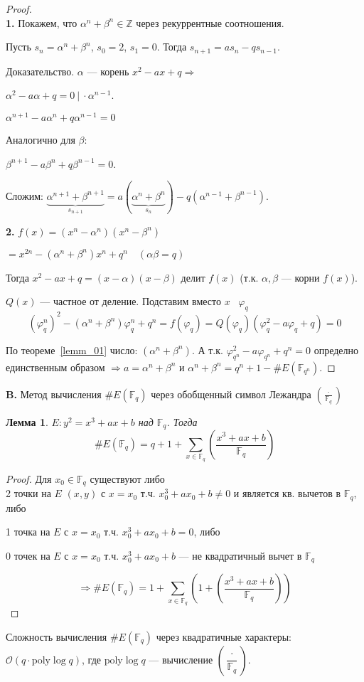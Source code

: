 \documentclass[12pt]{article}
\newcommand{\Z}{{{\mathbb Z}}}
\newcommand{\F}{{{\mathbb F}}}
\newcommand{\bigO}{\mathcal{O}}
\newtheorem{lemma}[theorem]{Лемма}
\theoremstyle{definition}
\theoremstyle{definition}
\theoremstyle{definition}
\begin{document}
\begin{proof}
$ $\\
\textbf{1. } Покажем, что ${\alpha^n} + {\beta ^n} \in \Z$ через рекуррентные соотношения.

Пусть ${s_n} = {\alpha ^n} + {\beta ^n}$, ${s_0} = 2$, ${s_1} = 0$. Тогда $s_{n + 1} = a{s_n} - qs_{n - 1}.$

Доказательство. $\alpha $ — корень $x^2 - ax + q \Rightarrow $

${\alpha ^2} - a \alpha + q = 0 \ |\ \cdot {\alpha^{n - 1}}$. 

${\alpha ^{n + 1}} - a{\alpha ^n} + q{\alpha ^{n - 1}} = 0$

Аналогично для $\beta $: 

${\beta ^{n+1}} - a {\beta ^n} + q{\beta ^{n - 1}} = 0$. 

Сложим: $\underbrace {{\alpha ^{n + 1}} + \beta ^{n + 1}}_{s_{n + 1}} = a ( {\underbrace {{\alpha^n} + {\beta ^n}}_{{s_n}}} ) - q( {{\alpha ^{n - 1}} + {\beta ^{n - 1}}} ).$

\textbf{2.} $f( x ) = ( {{x^n} - {\alpha^n}} ){( {{x^n} - {\beta ^n}} )}$

$ = {x^{2n}} - ( \alpha^n + \beta^n ){x^n} + {q^n}\quad ( \alpha\beta  = q )$

Тогда ${x^2} - ax + q = ( {x - \alpha } )( {x - \beta } )$ делит $f( x )$ (т.к. $\alpha, \beta $ — корни $f(x)$). 

$Q( x )$ — частное от деление. Подставим вместо $x$ \ $\varphi_q$
$$
( {\varphi _q^n} )^2 - ( {{\alpha^n} + {\beta ^n}} )\varphi _q^n + {q^n} = f( {{\varphi_q}} ) = Q( {{\varphi _q}} )( {\varphi _q^2 - a{\varphi _q} + q} ) = 0
$$

По теореме~\ref{lemm_01} число: $(\alpha^n + \beta^n )$. А т.к. $\varphi _{{q^n}}^2 - {a\varphi _{q^n}} + {q^n} = 0$  определно единственным образом $ \Rightarrow a = {\alpha ^n} + {\beta ^n}$ и ${\alpha ^n} + {\beta ^n} = {q^n} + 1 - \# E( {{\F_{q^n}}} )$. 
\end{proof}

\textbf{B.} Метод вычисления $\# E( \F_q )$ через обобщенный символ Лежандра $\left( {\frac{ \cdot }{{{\F_q}}}} \right)$

\begin{lemma}
	\label{lemm_03}
	$E:{y^2} = {x^3} + ax + b$ над ${\F_q}$. Тогда
	$$
	\# E( \F_q ) = q + 1 + \sum\limits_{x \in {\F_q}} {\left( {\frac{{{x^3} + ax + b}}{{{\F_q}}}} \right)} 
	$$
\end{lemma}

\begin{proof}Для  $x_0 \in \F_q $ существуют либо \\2 точки на $E$ $( {x,y} )$ с $x = {x_0}$ т.ч. $x_0^3 + a{x_0} + b \ne 0$ и является кв. вычетов в ${\F_q}$, либо

1 точка на $E$ с $x = {x_0}$ т.ч.  $x_0^3 + a{x_0} + b = 0$, либо

$0$ точек на $E$ с $x = {x_0}$ т.ч. $x_0^3 + a{x_0} + b$ — не квадратичный вычет в ${\F_q}$

$$
\Rightarrow \# E( \F_q ) = 1 + \sum\limits_{x \in {\F_q}} {\left( {1 + \left( {\frac{{x^3} + ax + b}{\F_q}} \right)} \right)}
$$
\end{proof}

Сложность вычисления $\# E( \F_q )$  через квадратичные характеры: $\bigO( {q \cdot {\text{poly}} \log q} )$,
где ${\text{poly}} \log q$ — вычисление $\left( {\dfrac{ \cdot }{\F_q}} \right)$.
\end{document}
